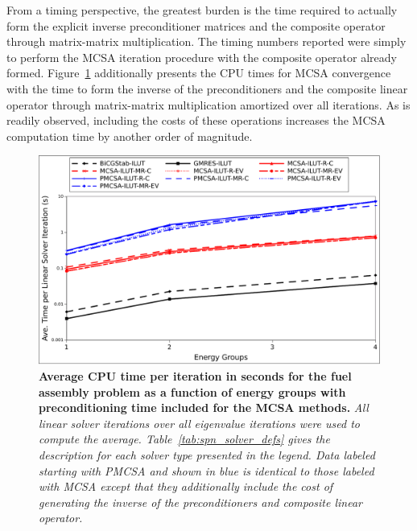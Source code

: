 \documentclass[letterpaper,11pt]{article}
\begin{document}
From a timing perspective, the greatest burden is the time required to
actually form the explicit inverse preconditioner matrices and the
composite operator through matrix-matrix multiplication. The timing
numbers reported were simply to perform the MCSA iteration procedure
with the composite operator already
formed. Figure~\ref{fig:spn_comparison_time} additionally presents the
CPU times for MCSA convergence with the time to form the inverse of
the preconditioners and the composite linear operator through
matrix-matrix multiplication amortized over all iterations. As is
readily observed, including the costs of these operations increases
the MCSA computation time by another order of magnitude.

\begin{figure}[t!]
  \begin{center}
    \includegraphics[width=5in]{solver_p_time.pdf}
  \end{center}
  \caption{\textbf{Average CPU time per iteration in seconds for the
      fuel assembly problem as a function of energy groups with
      preconditioning time included for the MCSA methods.}
    \textit{All linear solver iterations over all eigenvalue
      iterations were used to compute the
      average. Table~\ref{tab:spn_solver_defs} gives the description
      for each solver type presented in the legend. Data labeled
      starting with PMCSA and shown in blue is identical to those
      labeled with MCSA except that they additionally include the cost
      of generating the inverse of the preconditioners and composite
      linear operator.}}
  \label{fig:spn_comparison_time}
\end{figure}
\end{document}
